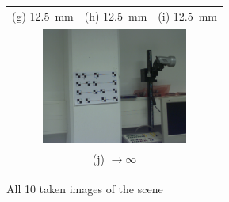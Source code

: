 \documentclass[
a4paper,     %
12pt         %
]{scrartcl}  %
\begin{document}
\begin{figure}[ht!]
\begin{tabular}{ccc}
(g) \SI{12.5}{mm} & (h) \SI{12.5}{mm} & (i) \SI{12.5}{mm}\\[6pt]
 \multicolumn{3}{c}{\includegraphics[width=48mm]{./Bildg_Messtechnik_Lab/CrossRatio/images/image_b5.png}} \\[6pt]
 \multicolumn{3}{c}{(j) $\rightarrow\infty$}
\end{tabular}
\caption{All 10 taken images of the scene}
\label{fig:cornermark_images}
\end{figure}



% 

% 
\end{document}
